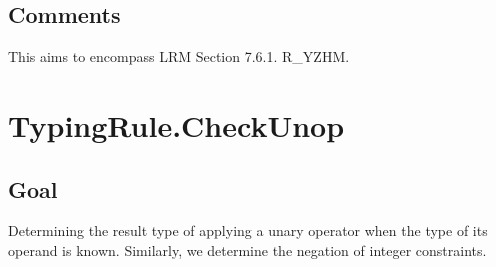 \documentclass{book}
\begin{document}
\subsection{Comments}
    This aims to encompass LRM Section 7.6.1. R\_YZHM.

\section{TypingRule.CheckUnop \label{sec:TypingRule.CheckUnop}}

\subsection{Goal}
  Determining the result type of applying a unary operator when the type of its operand is known.
  Similarly, we determine the negation of integer constraints.


\end{document}

